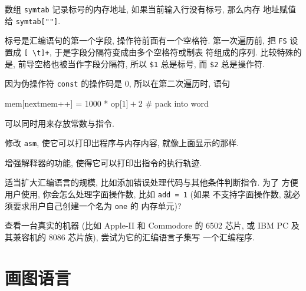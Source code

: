 数组 \texttt{symtab} 记录标号的内存地址, 如果当前输入行没有标号, 那么内存
地址赋值给 \texttt{symtab[""]}.

标号是汇编语句的第一个字段, 操作符前面有一个空格符. 第一次遍历前, 把
\texttt{FS} 设置成 \verb'[ \t]+', 于是字段分隔符变成由多个空格符或制表
符组成的序列. 比较特殊的是, 前导空格也被当作字段分隔符, 所以 \verb'$1'
总是标号, 而 \verb'$2' 总是操作符.

因为伪操作符 \texttt{const} 的操作码是 0, 所以在第二次遍历时, 语句
\begin{awkcode}
    mem[nextmem++] = 1000 * op[$1] + $2  # pack into word
\end{awkcode}
可以同时用来存放常数与指令.

\begin{exercise}
    修改 \texttt{asm}, 使它可以打印出程序与内存内容, 就像上面显示的那样.
\end{exercise}

\begin{exercise}
    增强解释器的功能, 使得它可以打印出指令的执行轨迹.
\end{exercise}

\begin{exercise}
    适当扩大汇编语言的规模, 比如添加错误处理代码与其他条件判断指令. 为了 
    方便用户使用, 你会怎么处理字面操作数, 比如 \texttt{add = 1} (如果 
    不支持字面操作数, 就必须要求用户自己创建一个名为 \texttt{one} 的
    内存单元)?
\end{exercise}

\begin{exercise}
    查看一台真实的机器 (比如 Apple-II 和 Commodore 的 6502 芯片, 或
    IBM PC 及其兼容机的 8086 芯片族), 尝试为它的汇编语言子集写
    一个汇编程序.
\end{exercise}

\section{画图语言}
\label{sec:a_language_for_drawing_graphs}

